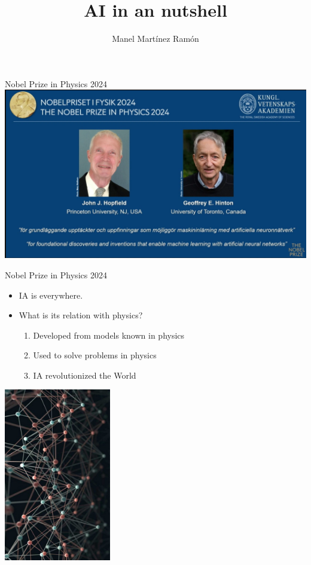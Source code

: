 \documentclass{beamer}
\author{Manel Mart\'inez Ram\'on}
\title{\textbf{AI in an nutshell}}
\subtitle{}
\date{}
\begin{document}
\maketitle

\begin{frame}{Nobel Prize in Physics 2024}
\centering
        \includegraphics[scale=0.27]{pics/HINTON_HOPFIELD.png}
\end{frame}

\begin{frame}{Nobel Prize in Physics 2024}
\begin{multicols}{2}
\begin{itemize}
    \item IA is everywhere. 
    \item What is its relation with physics?
    \begin{enumerate}
    \item  Developed from models known in physics
    \item  Used to solve problems in physics
    \item  IA revolutionized the World
\end{enumerate}
\end{itemize}


\columnbreak

\centering
\includegraphics[width=0.35\textwidth]{pics/neurons.jpeg}
    



\end{multicols}

\end{frame}
\end{document}

